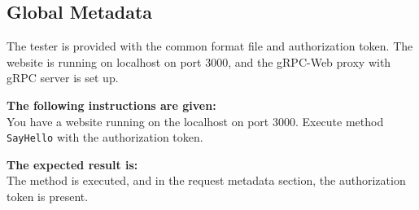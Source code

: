 \subsection{Global Metadata}
The tester is provided with the common format file and authorization token.
The website is running on localhost on port 3000, and the gRPC-Web proxy with gRPC server is set up.

\textbf{The following instructions are given:}\\
You have a website running on the localhost on port 3000.
Execute method \texttt{SayHello} with the authorization token.

\textbf{The expected result is:}\\
The method is executed, and in the request metadata section, the authorization token is present.

